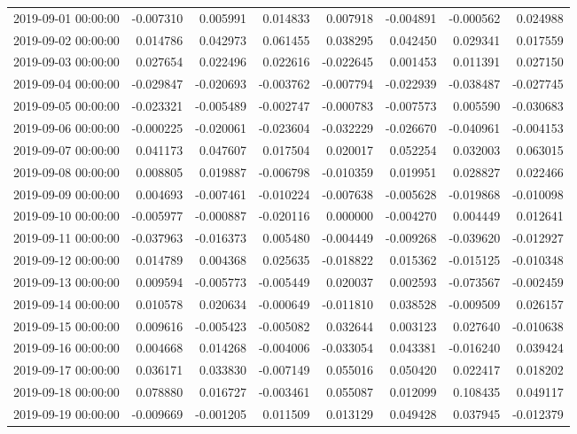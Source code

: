 \begin{tabular}{lrrrrrrr}
2019-09-01 00:00:00 & -0.007310 & 0.005991 & 0.014833 & 0.007918 & -0.004891 & -0.000562 & 0.024988 \\
2019-09-02 00:00:00 & 0.014786 & 0.042973 & 0.061455 & 0.038295 & 0.042450 & 0.029341 & 0.017559 \\
2019-09-03 00:00:00 & 0.027654 & 0.022496 & 0.022616 & -0.022645 & 0.001453 & 0.011391 & 0.027150 \\
2019-09-04 00:00:00 & -0.029847 & -0.020693 & -0.003762 & -0.007794 & -0.022939 & -0.038487 & -0.027745 \\
2019-09-05 00:00:00 & -0.023321 & -0.005489 & -0.002747 & -0.000783 & -0.007573 & 0.005590 & -0.030683 \\
2019-09-06 00:00:00 & -0.000225 & -0.020061 & -0.023604 & -0.032229 & -0.026670 & -0.040961 & -0.004153 \\
2019-09-07 00:00:00 & 0.041173 & 0.047607 & 0.017504 & 0.020017 & 0.052254 & 0.032003 & 0.063015 \\
2019-09-08 00:00:00 & 0.008805 & 0.019887 & -0.006798 & -0.010359 & 0.019951 & 0.028827 & 0.022466 \\
2019-09-09 00:00:00 & 0.004693 & -0.007461 & -0.010224 & -0.007638 & -0.005628 & -0.019868 & -0.010098 \\
2019-09-10 00:00:00 & -0.005977 & -0.000887 & -0.020116 & 0.000000 & -0.004270 & 0.004449 & 0.012641 \\
2019-09-11 00:00:00 & -0.037963 & -0.016373 & 0.005480 & -0.004449 & -0.009268 & -0.039620 & -0.012927 \\
2019-09-12 00:00:00 & 0.014789 & 0.004368 & 0.025635 & -0.018822 & 0.015362 & -0.015125 & -0.010348 \\
2019-09-13 00:00:00 & 0.009594 & -0.005773 & -0.005449 & 0.020037 & 0.002593 & -0.073567 & -0.002459 \\
2019-09-14 00:00:00 & 0.010578 & 0.020634 & -0.000649 & -0.011810 & 0.038528 & -0.009509 & 0.026157 \\
2019-09-15 00:00:00 & 0.009616 & -0.005423 & -0.005082 & 0.032644 & 0.003123 & 0.027640 & -0.010638 \\
2019-09-16 00:00:00 & 0.004668 & 0.014268 & -0.004006 & -0.033054 & 0.043381 & -0.016240 & 0.039424 \\
2019-09-17 00:00:00 & 0.036171 & 0.033830 & -0.007149 & 0.055016 & 0.050420 & 0.022417 & 0.018202 \\
2019-09-18 00:00:00 & 0.078880 & 0.016727 & -0.003461 & 0.055087 & 0.012099 & 0.108435 & 0.049117 \\
2019-09-19 00:00:00 & -0.009669 & -0.001205 & 0.011509 & 0.013129 & 0.049428 & 0.037945 & -0.012379 \\

\end{tabular}
